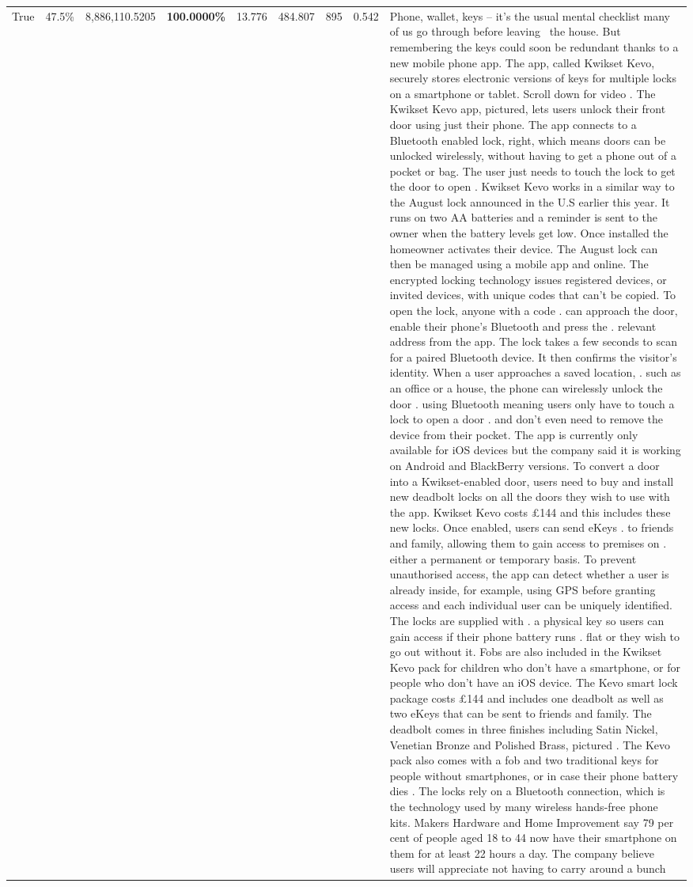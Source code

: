 \begin{table}[H]
\begin{tabular}{lllrlllll}
True & 47.5\% & 8,886,110.5205 & \bfseries \color{red} 100.0000\% & 13.776 & 484.807 & 895 & 0.542 & Phone, wallet, keys – it’s the usual mental checklist many of us go through before leaving  the house. But remembering the keys could soon be redundant thanks to a new mobile phone app. The app, called Kwikset Kevo, securely stores electronic versions of keys for multiple locks on a smartphone or tablet. Scroll down for video . The Kwikset Kevo app, pictured, lets users unlock their front door using just their phone. The app connects to a Bluetooth enabled lock, right, which means doors can be unlocked wirelessly, without having to get a phone out of a pocket or bag. The user just needs to touch the lock to get the door to open . Kwikset Kevo works in a similar way to the August lock announced in the U.S earlier this year. It runs on two AA batteries and a reminder is sent to the owner when the battery levels get low. Once installed the homeowner activates their device. The August lock can then be managed using a mobile app and online. The encrypted locking technology issues registered devices, or invited devices, with unique codes that can't be copied. To open the lock, anyone with a code . can approach the door, enable their phone's Bluetooth and press the . relevant address from the app. The lock takes a few seconds to scan for a paired Bluetooth device. It then confirms the visitor's identity. When a user approaches a saved location, . such as an office or a house, the phone can wirelessly unlock the door . using Bluetooth meaning users only have to touch a lock to open a door . and don't even need to remove the device from their pocket. The app is currently only available for iOS devices but the company said it is working on Android and BlackBerry versions. To convert a door into a Kwikset-enabled door, users need to buy and install new deadbolt locks on all the doors they wish to use with the app. Kwikset Kevo costs £144 and this includes these new locks. Once enabled, users can send eKeys . to friends and family, allowing them to gain access to premises on . either a permanent or temporary basis. To prevent unauthorised access, the app can detect whether a user is already inside, for example, using GPS before granting access and each individual user can be uniquely identified. The locks are supplied with . a physical key so users can gain access if their phone battery runs . flat or they wish to go out without it. Fobs are also included in the Kwikset Kevo pack for children who don't have a smartphone, or for people who don't have an iOS device. The Kevo smart lock package costs £144 and includes one deadbolt as well as two eKeys that can be sent to friends and family. The deadbolt comes in three finishes including Satin Nickel, Venetian Bronze and Polished Brass, pictured . The Kevo pack also comes with a fob and two traditional keys for people without smartphones, or in case their phone battery dies . The locks rely on a Bluetooth connection, which is the technology used by many wireless hands-free phone kits. Makers Hardware and Home Improvement say 79 per cent of people aged 18 to 44 now have their smartphone on them for at least 22 hours a day. The company believe users will appreciate not having to carry around a bunch 
\end{tabular}
\end{table}
